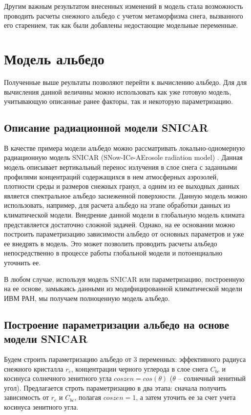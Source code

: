 \documentclass[a4paper, fontsize=14pt]{scrartcl}
\begin{document}
Другим важным результатом внесенных изменений в модель стала возможность проводить расчеты снежного альбедо с учетом метаморфизма снега, вызванного его старением, так как были добавлены недостающие модельные переменные.


\newpage
\section{Модель альбедо}

Полученные выше реультаты позволяют перейти к вычислению альбедо. Для для вычисления данной величины можно использовать как уже готовую модель, учитывающую описанные ранее факторы, так и некоторую параметризацию. 

\subsection{Описание радиационной модели SNICAR}
В качестве примера модели альбедо можно рассматривать локально-одномерную радиационную модель SNICAR (SNow-ICe-AErosole radiation model) \cite{Flanner2007}. Данная модель описывает вертикальный перенос излучения в слое снега с заданными профилями концентраций содержащихся в нем атмосферных аэрозолей, плотности среды и размеров снежных гранул, а одним из ее выходных данных является спектральное альбедо заснеженной поверхности. Данную модель можно использовать, например, для расчета альбедо на этапе обработки данных из климатической модели. Внедрение данной модели в глобальную модель климата представляется достаточно сложной задачей. Однако, на ее основании можно построить параметризацию зависимости альбедо от основных параметров и уже ее внедрять в модель. Это может позволить проводить расчеты альбедо непосредственно в процессе работы глобальной модели и потоенциально уточнить ее.

В любом случае, используя модель SNICAR или параметризацию, построенную на ее основе, замыкаясь данными из модифицированной климатической модели ИВМ РАН, мы получаем полноценную модель альбедо.

\subsection{Построение параметризации альбедо на основе модели SNICAR}

Будем строить параметризацию альбедо от 3 переменных: эффективного радиуса снежного кристалла $r_e$, концентрации черного углерода в слое снега $C_{bc}$ и косинуса солнечного зенитного угла $coszen = cos(\theta)$ ($\theta$ -- солнечный зенитный угол). Предлагается строть параметризацию в два этапа: сначала получить зависимость от $r_e$ и $C_{bc}$, полагая $coszen = 1$, а затем уточить ее за счет учета косинуса зенитного угла.
\end{document}
